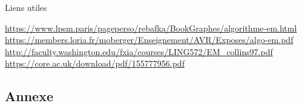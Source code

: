 \documentclass[frenchb]{report}
\newcommand{\1}{\mathbbm{1}}
\theoremstyle{definition}\newtheorem{defn}{Définition}
\theoremstyle{definition}\newtheorem{exm}{Exemple}
\theoremstyle{definition}\newtheorem{nota}{Notation}
\theoremstyle{definition}\newtheorem{rem}{Remarque}
\begin{document}
Liens utiles

\url{https://www.lpsm.paris/pageperso/rebafka/BookGraphes/algorithme-em.html} \newline
\url{https://members.loria.fr/moberger/Enseignement/AVR/Exposes/algo-em.pdf} \newline
\url{http://faculty.washington.edu/fxia/courses/LING572/EM_collins97.pdf}\newline
\url{https://core.ac.uk/download/pdf/155777956.pdf}


\pagebreak
\begin{appendix}
\chapter{Annexe}

\end{appendix}
\end{document}
